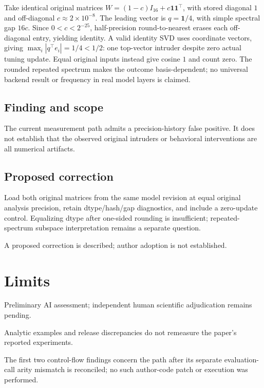 \documentclass[11pt]{article}
\begin{document}
Take identical original matrices \(W=(1-c)I_{16}+c\mathbf1\mathbf1^\top\), with stored diagonal \(1\) and off-diagonal \(c\approx2\times10^{-8}\). The leading vector is \(q=\mathbf1/4\), with simple spectral gap \(16c\). Since \(0<c<2^{-25}\), half-precision round-to-nearest erases each off-diagonal entry, yielding identity. A valid identity SVD uses coordinate vectors, giving \(\max_i|q^\top e_i|=1/4<1/2\): one top-vector intruder despite zero actual tuning update. Equal original inputs instead give cosine \(1\) and count zero. The rounded repeated spectrum makes the outcome basis-dependent; no universal backend result or frequency in real model layers is claimed.

\subsection*{Finding and scope}

The current measurement path admits a precision-history false positive. It does not establish that the observed original intruders or behavioral interventions are all numerical artifacts.

\subsection*{Proposed correction}

Load both original matrices from the same model revision at equal original analysis precision, retain dtype/hash/gap diagnostics, and include a zero-update control. Equalizing dtype after one-sided rounding is insufficient; repeated-spectrum subspace interpretation remains a separate question.

A proposed correction is described; author adoption is not established.

\section*{Limits}

Preliminary AI assessment; independent human scientific adjudication remains pending.\par

Analytic examples and release discrepancies do not remeasure the paper’s reported experiments.\par

The first two control-flow findings concern the path after its separate evaluation-call arity mismatch is reconciled; no such author-code patch or execution was performed.\par
\end{document}
